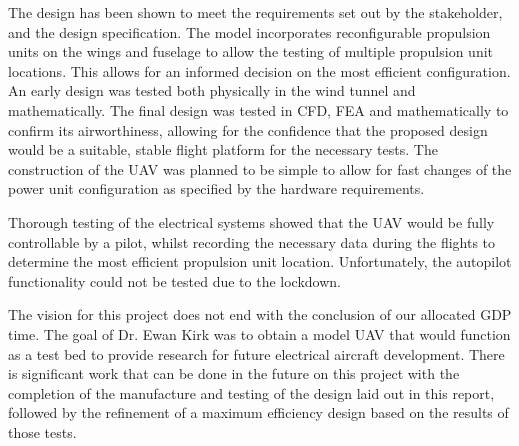 \documentclass[../../main.tex]{subfiles}
\begin{document}
The design has been shown to meet the requirements set out by the stakeholder, and the design specification.
The model incorporates reconfigurable propulsion units on the wings and fuselage to allow the testing of multiple propulsion unit locations.
This allows for an informed decision on the most efficient configuration.
An early design was tested both physically in the wind tunnel and mathematically.
The final design was tested in CFD, FEA and mathematically to confirm its airworthiness, allowing for the confidence that the proposed design would be a suitable, stable flight platform for the necessary tests.
The construction of the UAV was planned to be simple to allow for fast changes of the power unit configuration as specified by the hardware requirements. 

Thorough testing of the electrical systems showed that the UAV would be fully controllable by a pilot, whilst recording the necessary data during the flights to determine the most efficient propulsion unit location.
Unfortunately, the autopilot functionality could not be tested due to the lockdown.  

The vision for this project does not end with the conclusion of our allocated GDP time.
The goal of Dr. Ewan Kirk was to obtain a model UAV that would function as a test bed to provide research for future electrical aircraft development.
There is significant work that can be done in the future on this project with the completion of the manufacture and testing of the design laid out in this report, followed by the refinement of a maximum efficiency design based on the results of those tests. 
\end{document}
